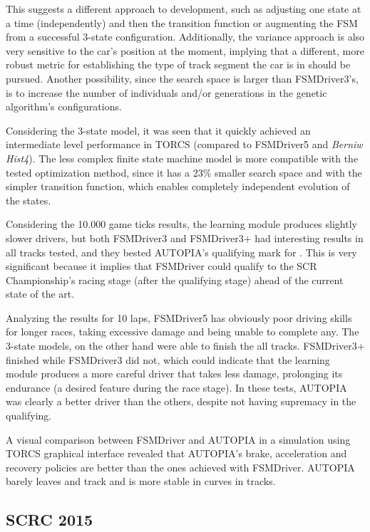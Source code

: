 This suggests a different approach to development, such as adjusting one state at a time (independently) and then the transition function or augmenting the FSM from a successful 3-state configuration. Additionally, the variance approach is also very sensitive to the car's position at the moment, implying that a different, more robust metric for establishing the type of track segment the car is in should be pursued. Another possibility, since the search space is larger than FSMDriver3's, is to increase the number of individuals and/or generations in the genetic algorithm's configurations.

Considering the 3-state model, it was seen that it quickly achieved an intermediate level performance in TORCS (compared to FSMDriver5 and \emph{Berniw Hist4}). The less complex finite state machine model is more compatible with the tested optimization method, since it has a 23\% smaller search space and with the simpler transition function, which enables completely independent evolution of the states.

Considering the 10.000 game ticks results, the learning module produces slightly slower drivers, but both FSMDriver3 and FSMDriver3+ had interesting results in all tracks tested, and they bested AUTOPIA's qualifying mark for . This is very significant because it implies that FSMDriver could qualify to the SCR Championship's racing stage (after the qualifying stage) ahead of the current state of the art.

Analyzing the results for 10 laps, FSMDriver5 has obviously poor driving skills for longer races, taking excessive damage and being unable to complete any. The 3-state models, on the other hand were able to finish the all tracks. FSMDriver3+ finished  while FSMDriver3 did not, which could indicate that the learning module produces a more careful driver that takes less damage, prolonging its endurance (a desired feature during the race stage). In these tests, AUTOPIA was clearly a better driver than the others, despite not having supremacy in the qualifying.

A visual comparison between FSMDriver and AUTOPIA in a simulation using TORCS graphical interface revealed that AUTOPIA's brake, acceleration and recovery policies are better than the ones achieved with FSMDriver. AUTOPIA barely leaves and track and is more stable in curves in  tracks.

\subsection{SCRC 2015}%

